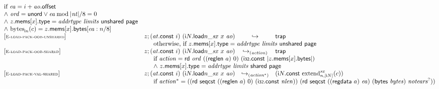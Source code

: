 $$\begin{array}[t]{@{}lrcl@{}l@{}}
{\begin{array}[t]{@{}l@{}}
\mbox{if}~ {\mathit{ea}} = i + {\mathit{ao}}{.}\mathsf{offset} \\
{\land}~ {\mathit{ord}} = \mathsf{unord} \lor {\mathit{ea}} \mathbin{\mathrm{mod}} {|{\mathit{nt}}|} / 8 = 0 \\
{\land}~ z{.}\mathsf{mems}{}[x]{.}\mathsf{type} = {\mathit{addrtype}}~{\mathit{limits}}~\mathsf{unshared}~\mathsf{page} \\
{\land}~ {{\mathrm{bytes}}}_{{\mathsf{i}}{n}}(c) = z{.}\mathsf{mems}{}[x]{.}\mathsf{bytes}{}[{\mathit{ea}} : n / 8] \\
\end{array}
} \\
{[\textsc{\scriptsize E{-}load{-}pack{-}oob{-}unshared}]} \quad & z ; ({\mathit{at}}{.}\mathsf{const}~i)~({{\mathsf{i}}{N}{.}\mathsf{load}}{{n}{\mathsf{\_}}{{\mathit{sx}}}}~x~{\mathit{ao}}) & \hookrightarrow & \mathsf{trap} &  \\
& \multicolumn{4}{@{}l@{}}{\quad
\quad \mbox{otherwise, if}~ z{.}\mathsf{mems}{}[x]{.}\mathsf{type} = {\mathit{addrtype}}~{\mathit{limits}}~\mathsf{unshared}~\mathsf{page}
} \\
{[\textsc{\scriptsize E{-}load{-}pack{-}oob{-}shared}]} \quad & z ; ({\mathit{at}}{.}\mathsf{const}~i)~({{\mathsf{i}}{N}{.}\mathsf{load}}{{n}{\mathsf{\_}}{{\mathit{sx}}}}~x~{\mathit{ao}}) & {\hookrightarrow}_{({\mathit{action}})} {} & \mathsf{trap} &  \\
& \multicolumn{4}{@{}l@{}}{\quad
\quad
\begin{array}[t]{@{}l@{}}
\mbox{if}~ {\mathit{action}} = \mathsf{rd}~{\mathit{ord}}~((\mathsf{reglen}~a)~0)~(\mathsf{i{\scriptstyle 32}}{.}\mathsf{const}~{|z{.}\mathsf{mems}{}[x]{.}\mathsf{bytes}|}) \\
{\land}~ z{.}\mathsf{mems}{}[x]{.}\mathsf{type} = {\mathit{addrtype}}~{\mathit{limits}}~\mathsf{shared}~\mathsf{page} \\
\end{array}
} \\
{[\textsc{\scriptsize E{-}load{-}pack{-}val{-}shared}]} \quad & z ; ({\mathit{at}}{.}\mathsf{const}~i)~({{\mathsf{i}}{N}{.}\mathsf{load}}{{n}{\mathsf{\_}}{{\mathit{sx}}}}~x~{\mathit{ao}}) & {\hookrightarrow}_{({{\mathit{action}}^\ast})} {} & ({\mathsf{i}}{N}{.}\mathsf{const}~{{{{\mathrm{extend}}}_{n, {|{\mathsf{i}}{N}|}}^{{\mathit{sx}}}}}{(c)}) &  \\
& \multicolumn{4}{@{}l@{}}{\quad
\quad
\begin{array}[t]{@{}l@{}}
\mbox{if}~ {{\mathit{action}}^\ast} = ((\mathsf{rd}~\mathsf{seqcst}~((\mathsf{reglen}~a)~0)~(\mathsf{i{\scriptstyle 32}}{.}\mathsf{const}~{\mathit{nlen}}))~(\mathsf{rd}~\mathsf{seqcst}~((\mathsf{regdata}~a)~{\mathit{ea}})~(\mathsf{bytes}~{\mathit{bytes}})~{{\mathit{notears}}^?})) \\

\end{array}}
\end{array}$$
